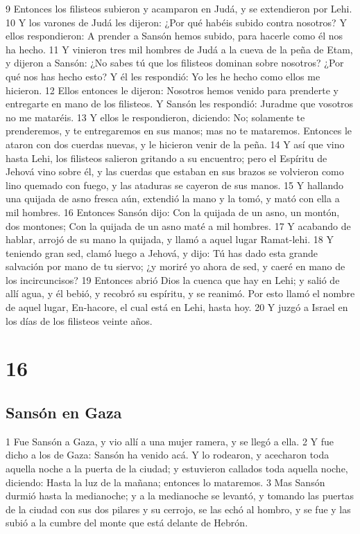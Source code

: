 9 Entonces los filisteos subieron y acamparon en Judá, y se extendieron por Lehi.
10 Y los varones de Judá les dijeron: ¿Por qué habéis subido contra nosotros? Y ellos respondieron: A prender a Sansón hemos subido, para hacerle como él nos ha hecho.
11 Y vinieron tres mil hombres de Judá a la cueva de la peña de Etam, y dijeron a Sansón: ¿No sabes tú que los filisteos dominan sobre nosotros? ¿Por qué nos has hecho esto? Y él les respondió: Yo les he hecho como ellos me hicieron.
12 Ellos entonces le dijeron: Nosotros hemos venido para prenderte y entregarte en mano de los filisteos. Y Sansón les respondió: Juradme que vosotros no me mataréis.
13 Y ellos le respondieron, diciendo: No; solamente te prenderemos, y te entregaremos en sus manos; mas no te mataremos. Entonces le ataron con dos cuerdas nuevas, y le hicieron venir de la peña.
14 Y así que vino hasta Lehi, los filisteos salieron gritando a su encuentro; pero el Espíritu de Jehová vino sobre él, y las cuerdas que estaban en sus brazos se volvieron como lino quemado con fuego, y las ataduras se cayeron de sus manos.
15 Y hallando una quijada de asno fresca aún, extendió la mano y la tomó, y mató con ella a mil hombres.
16 Entonces Sansón dijo:
Con la quijada de un asno, un montón, dos montones;
Con la quijada de un asno maté a mil hombres.
17 Y acabando de hablar, arrojó de su mano la quijada, y llamó a aquel lugar Ramat-lehi.
18 Y teniendo gran sed, clamó luego a Jehová, y dijo: Tú has dado esta grande salvación por mano de tu siervo; ¿y moriré yo ahora de sed, y caeré en mano de los incircuncisos?
19 Entonces abrió Dios la cuenca que hay en Lehi; y salió de allí agua, y él bebió, y recobró su espíritu, y se reanimó. Por esto llamó el nombre de aquel lugar, En-hacore, el cual está en Lehi, hasta hoy.
20 Y juzgó a Israel en los días de los filisteos veinte años.

\chapter{16}

\section*{Sansón en Gaza}

1 Fue Sansón a Gaza, y vio allí a una mujer ramera, y se llegó a ella.
2 Y fue dicho a los de Gaza: Sansón ha venido acá. Y lo rodearon, y acecharon toda aquella noche a la puerta de la ciudad; y estuvieron callados toda aquella noche, diciendo: Hasta la luz de la mañana; entonces lo mataremos.
3 Mas Sansón durmió hasta la medianoche; y a la medianoche se levantó, y tomando las puertas de la ciudad con sus dos pilares y su cerrojo, se las echó al hombro, y se fue y las subió a la cumbre del monte que está delante de Hebrón.

